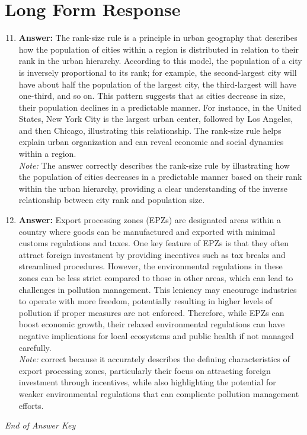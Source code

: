\documentclass[12pt]{article}
\begin{document}
\section*{Long Form Response}
\begin{enumerate}[label=\arabic*.]
\setcounter{enumi}{10}
\item \textbf{Answer:} The rank-size rule is a principle in urban geography that describes how the population of cities within a region is distributed in relation to their rank in the urban hierarchy. According to this model, the population of a city is inversely proportional to its rank; for example, the second-largest city will have about half the population of the largest city, the third-largest will have one-third, and so on. This pattern suggests that as cities decrease in size, their population declines in a predictable manner. For instance, in the United States, New York City is the largest urban center, followed by Los Angeles, and then Chicago, illustrating this relationship. The rank-size rule helps explain urban organization and can reveal economic and social dynamics within a region.
\\ \textit{Note:} The answer correctly describes the rank-size rule by illustrating how the population of cities decreases in a predictable manner based on their rank within the urban hierarchy, providing a clear understanding of the inverse relationship between city rank and population size.
\item \textbf{Answer:} Export processing zones (EPZs) are designated areas within a country where goods can be manufactured and exported with minimal customs regulations and taxes. One key feature of EPZs is that they often attract foreign investment by providing incentives such as tax breaks and streamlined procedures. However, the environmental regulations in these zones can be less strict compared to those in other areas, which can lead to challenges in pollution management. This leniency may encourage industries to operate with more freedom, potentially resulting in higher levels of pollution if proper measures are not enforced. Therefore, while EPZs can boost economic growth, their relaxed environmental regulations can have negative implications for local ecosystems and public health if not managed carefully.
\\ \textit{Note:} correct because it accurately describes the defining characteristics of export processing zones, particularly their focus on attracting foreign investment through incentives, while also highlighting the potential for weaker environmental regulations that can complicate pollution management efforts.
\end{enumerate}

\vfill
\noindent\textit{End of Answer Key}
\end{document}
